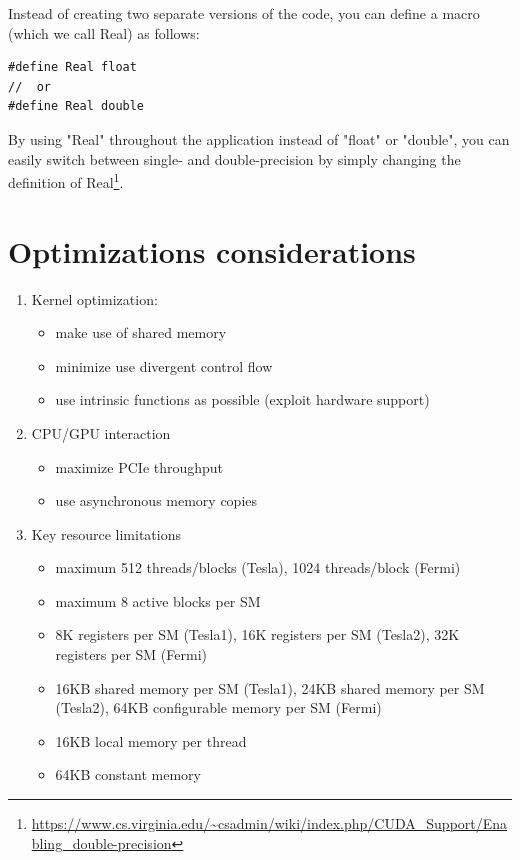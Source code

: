 \begin{framed}
  
Instead of creating two separate versions of the code, you can define
a macro (which we call Real) as follows:
\begin{lstlisting}
#define Real float
//  or
#define Real double
\end{lstlisting}
By using "Real" throughout the application instead of "float" or
"double", you can easily switch between single- and double-precision
by simply changing the definition of
Real\footnote{\url{https://www.cs.virginia.edu/~csadmin/wiki/index.php/CUDA_Support/Enabling_double-precision}}.

\end{framed}


\section{Optimizations considerations}
\label{sec:optim-cons}

\begin{enumerate}
\item Kernel optimization:
  \begin{itemize}
  \item make use of shared memory
  \item minimize use divergent control flow
  \item use intrinsic functions as possible (exploit hardware support)
  \end{itemize}
\item CPU/GPU interaction
  \begin{itemize}
  \item maximize PCIe throughput
  \item use asynchronous memory copies 
  \end{itemize}

\item Key resource limitations
  \begin{itemize}
  \item maximum 512 threads/blocks (Tesla), 1024 threads/block (Fermi)
  \item maximum 8 active blocks per SM
  \item 8K registers per SM (Tesla1), 16K registers per SM (Tesla2),
    32K registers per SM (Fermi)
  \item 16KB shared memory per SM (Tesla1), 24KB shared memory per SM
    (Tesla2), 64KB configurable memory per SM (Fermi)
  \item 16KB local memory per thread
  \item 64KB constant memory
  \end{itemize}
\end{enumerate}

